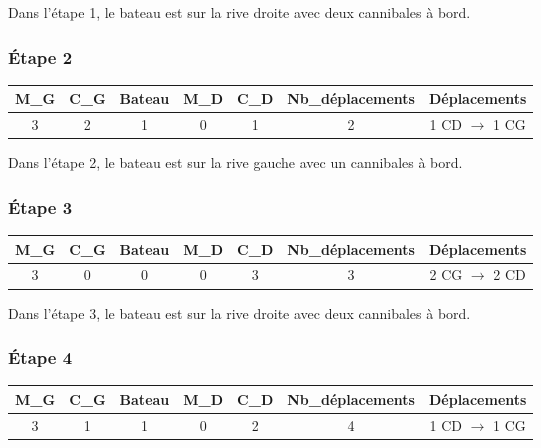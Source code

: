 \documentclass{article}
\begin{document}
\noindent Dans l'étape 1, le bateau est sur la rive droite avec deux cannibales à bord.

\subsubsection{Étape 2}

\begin{center}
\begin{tabular}{|c|c|c|c|c|c|c|}
\hline
\textbf{M\_G} & \textbf{C\_G} & \textbf{Bateau} & \textbf{M\_D} & \textbf{C\_D} & \textbf{Nb\_déplacements} & \textbf{Déplacements} \\
\hline
3 & 2 & 1 & 0 & 1 & 2 & 1 CD $\rightarrow$ 1 CG \\
\hline
\end{tabular}
\end{center}

\noindent Dans l'étape 2, le bateau est sur la rive gauche avec un cannibales à bord.

\subsubsection{Étape 3}

\begin{center}
\begin{tabular}{|c|c|c|c|c|c|c|}
\hline
\textbf{M\_G} & \textbf{C\_G} & \textbf{Bateau} & \textbf{M\_D} & \textbf{C\_D} & \textbf{Nb\_déplacements} & \textbf{Déplacements} \\
\hline
3 & 0 & 0 & 0 & 3 & 3 & 2 CG $\rightarrow$ 2 CD \\
\hline
\end{tabular}
\end{center}

\noindent Dans l'étape 3, le bateau est sur la rive droite avec deux cannibales à bord.

\subsubsection{Étape 4}

\begin{center}
\begin{tabular}{|c|c|c|c|c|c|c|}
\hline
\textbf{M\_G} & \textbf{C\_G} & \textbf{Bateau} & \textbf{M\_D} & \textbf{C\_D} & \textbf{Nb\_déplacements} & \textbf{Déplacements} \\
\hline
3 & 1 & 1 & 0 & 2 & 4 & 1 CD $\rightarrow$ 1 CG \\
\hline
\end{tabular}
\end{center}
\end{document}

